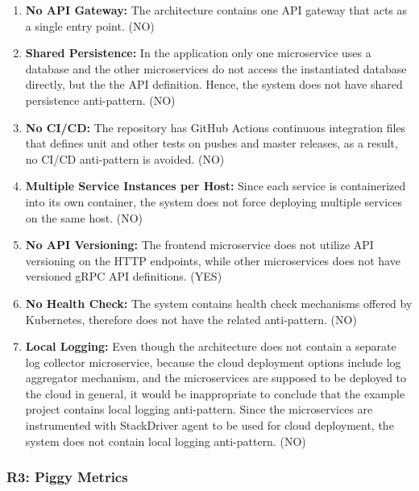 \documentclass{Configuration_Files/PoliMi3i_thesis}
\begin{document}
\begin{enumerate}
    \item \textbf{No API Gateway:} The architecture contains one API gateway that acts as a single entry point. (NO)
    
    \item \textbf{Shared Persistence:} In the application only one microservice uses a database and the other microservices do not access the instantiated database directly, but the the API definition.
    Hence, the system does not have shared persistence anti-pattern. (NO)
    
    \item \textbf{No CI/CD:} The repository has GitHub Actions continuous integration files that defines unit and other tests on pushes and master releases, as a result, no CI/CD anti-pattern is avoided. (NO)
    
    \item \textbf{Multiple Service Instances per Host:} Since each service is containerized into its own container, the system does not force deploying multiple services on the same host. (NO)
    
    \item \textbf{No API Versioning:} The frontend microservice does not utilize API versioning on the HTTP endpoints, while other microservices does not have versioned gRPC API definitions. (YES)
    
    \item \textbf{No Health Check:} The system contains health check mechanisms offered by Kubernetes, therefore does not have the related anti-pattern. (NO)
    
    \item \textbf{Local Logging:} Even though the architecture does not contain a separate log collector microservice, because the cloud deployment options include log aggregator mechanism, and the microservices are supposed to be deployed to the cloud in general, it would be inappropriate to conclude that the example project contains local logging anti-pattern.
    Since the microservices are instrumented with StackDriver agent to be used for cloud deployment, the system does not contain local logging anti-pattern. (NO)
\end{enumerate}

\subsubsection{R3: Piggy Metrics}
\label{subsubsec:R3}
\end{document}

